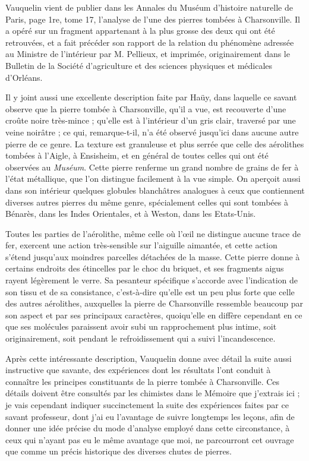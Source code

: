 \documentclass[a4paper, 12pt, oneside, french]{article}
\begin{document}
Vauquelin vient de publier dans les Annales du Muséum d'histoire naturelle de Paris, page 1re, tome 17, l'analyse de l'une des pierres tombées à Charsonville. Il a opéré sur un fragment appartenant à la plus grosse des deux qui ont été retrouvées, et a fait précéder son rapport de la relation du phénomène adressée au Ministre de l'intérieur par M. Pellieux, et imprimée, originairement dans le Bulletin de la Société d'agriculture et des sciences physiques et médicales d'Orléans.

Il y joint aussi une excellente description faite par Haüy, dans laquelle ce savant observe que la pierre tombée à Charsonville, qu'il a vue, est recouverte d'une croûte noire très-mince ; qu'elle est à l'intérieur d'un gris clair, traversé par une veine noirâtre ; ce qui, remarque-t-il, n'a été observé jusqu'ici dans aucune autre pierre de ce genre. La texture est granuleuse et plus serrée que celle des aérolithes tombées à l'Aigle, à Ensisheim, et en général de toutes celles qui ont été observées au \emph{Muséum}. Cette pierre renferme un grand nombre de grains de fer à l'état métallique, que l'on distingue facilement à la vue simple. On aperçoit aussi dans son intérieur quelques globules blanchâtres analogues à ceux que contiennent diverses autres pierres du même genre, spécialement celles qui sont tombées à Bénarès, dans les Indes Orientales, et à Weston, dans les Etats-Unis.

Toutes les parties de l'aérolithe, même celle où l'œil ne distingue aucune trace de fer, exercent une action très-sensible sur l'aiguille aimantée, et cette action s'étend jusqu'aux moindres parcelles détachées de la masse. Cette pierre donne à certains endroits des étincelles par le choc du briquet, et ses fragments aigus rayent légèrement le verre. Sa pesanteur spécifique s'accorde avec l'indication de son tissu et de sa consistance, c'est-à-dire qu'elle est un peu plus forte que celle des autres aérolithes, auxquelles la pierre de Charsonville ressemble beaucoup par son aspect et par ses principaux caractères, quoiqu’elle en diffère cependant en ce que ses molécules paraissent avoir subi un rapprochement plus intime, soit originairement, soit pendant le refroidissement qui a suivi l'incandescence.

Après cette intéressante description, Vauquelin donne avec détail la suite aussi instructive que savante, des expériences dont les résultats l'ont conduit à connaître les principes constituants de la pierre tombée à Charsonville. Ces détails doivent être consultés par les chimistes dans le Mémoire que j'extrais ici ; je vais cependant indiquer succinctement la suite des expériences faites par ce savant professeur, dont j'ai eu l'avantage de suivre longtemps les leçons, afin de donner une idée précise du mode d'analyse employé dans cette circonstance, à ceux qui n'ayant pas eu le même avantage que moi, ne parcourront cet ouvrage que comme un précis historique des diverses chutes de pierres.
\end{document}
